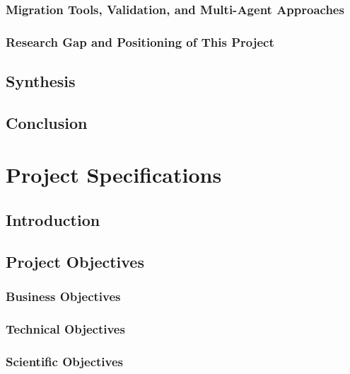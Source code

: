 \documentclass[12pt,a4paper]{report}
\begin{document}
  \subsection{Migration Tools, Validation, and Multi-Agent Approaches}
  \label{subsec:related-migration}

  \subsection{Research Gap and Positioning of This Project}
  \label{subsec:research-gap}

\section{Synthesis}
\label{sec:ch2-synthesis}

\section{Conclusion}
\label{sec:ch2-conclusion}


\chapter{Project Specifications}
\label{ch:specifications}

\section{Introduction}
\label{sec:ch3-intro}

\section{Project Objectives}
\label{sec:objectives}

  \subsection{Business Objectives}
  \label{subsec:business-objectives}

  \subsection{Technical Objectives}
  \label{subsec:technical-objectives}

  \subsection{Scientific Objectives}
  \label{subsec:scientific-objectives}
\end{document}
